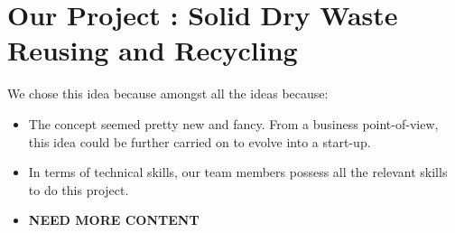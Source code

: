 \documentclass{article}
\begin{document}
\section{Our Project : Solid Dry Waste Reusing and Recycling}
\par We chose this idea because amongst all the ideas because:
\begin{itemize}
    \item The concept seemed pretty new and fancy. From a business point-of-view, this idea could be further carried on to evolve into a start-up. 
    \item In terms of technical skills, our team members possess all the relevant skills to do this project.
    \item \textbf{NEED MORE CONTENT}
\end{itemize} 
\end{document}
